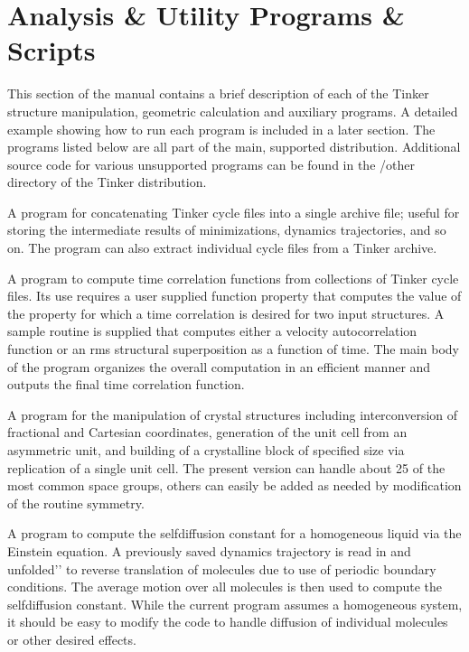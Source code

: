 \documentclass[letterpaper,11pt,english]{sphinxmanual}
\begin{document}
\chapter{Analysis \& Utility Programs \& Scripts}
\label{\detokenize{text/analysis-programs:analysis-utility-programs-scripts}}\label{\detokenize{text/analysis-programs::doc}}
This section of the manual contains a brief description of each of the Tinker structure manipulation, geometric calculation and auxiliary programs. A detailed example showing how to run each program is included in a later section. The programs listed below are all part of the main, supported distribution. Additional source code for various unsupported programs can be found in the /other directory of the Tinker distribution.


A program for concatenating Tinker cycle files into a single archive file; useful for storing the intermediate results of minimizations, dynamics trajectories, and so on. The program can also extract individual cycle files from a Tinker archive.


A program to compute time correlation functions from collections of Tinker cycle files. Its use requires a user supplied function property that computes the value of the property for which a time correlation is desired for two input structures. A sample routine is supplied that computes either a velocity autocorrelation function or an rms structural superposition as a function of time. The main body of the program organizes the overall computation in an efficient manner and outputs the final time correlation function.


A program for the manipulation of crystal structures including interconversion of fractional and Cartesian coordinates, generation of the unit cell from an asymmetric unit, and building of a crystalline block of specified size via replication of a single unit cell. The present version can handle about 25 of the most common space groups, others can easily be added as needed by modification of the routine symmetry.


A program to compute the self\sphinxhyphen{}diffusion constant for a homogeneous liquid via the Einstein equation. A previously saved dynamics trajectory is read in and {\color{red}\bfseries{}\textasciigrave{}\textasciigrave{}}unfolded’’ to reverse translation of molecules due to use of periodic boundary conditions. The average motion over all molecules is then used to compute the self\sphinxhyphen{}diffusion constant. While the current program assumes a homogeneous system, it should be easy to modify the code to handle diffusion of individual molecules or other desired effects.
\end{document}
